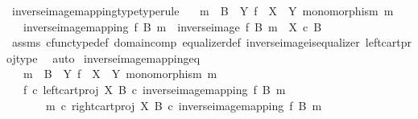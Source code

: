 \begin{isabellebody}
%
\endisatagproof
{\isafoldproof}%
%
\isadelimproof
\isanewline
%
\endisadelimproof
\isanewline
{}\isamarkupfalse%
\ inverse{\isacharunderscore}{\kern0pt}image{\isacharunderscore}{\kern0pt}mapping{\isacharunderscore}{\kern0pt}type{\isacharbrackleft}{\kern0pt}type{\isacharunderscore}{\kern0pt}rule{\isacharbrackright}{\kern0pt}{\isacharcolon}{\kern0pt}\isanewline
\ \ \ {\isachardoublequoteopen}m\ {\isacharcolon}{\kern0pt}\ B\ {\isasymrightarrow}\ Y{\isachardoublequoteclose}\ {\isachardoublequoteopen}f\ {\isacharcolon}{\kern0pt}\ X\ {\isasymrightarrow}\ Y{\isachardoublequoteclose}\ {\isachardoublequoteopen}monomorphism\ m{\isachardoublequoteclose}\isanewline
\ \ \ {\isachardoublequoteopen}inverse{\isacharunderscore}{\kern0pt}image{\isacharunderscore}{\kern0pt}mapping\ f\ B\ m\ {\isacharcolon}{\kern0pt}\ {\isacharparenleft}{\kern0pt}inverse{\isacharunderscore}{\kern0pt}image\ f\ B\ m{\isacharparenright}{\kern0pt}\ {\isasymrightarrow}\ X\ {\isasymtimes}\isactrlsub c\ B{\isachardoublequoteclose}\isanewline
%
\isadelimproof
\ \ %
\endisadelimproof
%
\isatagproof
{}\isamarkupfalse%
\ assms\ cfunc{\isacharunderscore}{\kern0pt}type{\isacharunderscore}{\kern0pt}def\ domain{\isacharunderscore}{\kern0pt}comp\ equalizer{\isacharunderscore}{\kern0pt}def\ inverse{\isacharunderscore}{\kern0pt}image{\isacharunderscore}{\kern0pt}is{\isacharunderscore}{\kern0pt}equalizer{}\ left{\isacharunderscore}{\kern0pt}cart{\isacharunderscore}{\kern0pt}proj{\isacharunderscore}{\kern0pt}type\ \isamarkupfalse%
\ auto%
\endisatagproof
{\isafoldproof}%
%
\isadelimproof
\isanewline
%
\endisadelimproof
\isanewline
{}\isamarkupfalse%
\ inverse{\isacharunderscore}{\kern0pt}image{\isacharunderscore}{\kern0pt}mapping{\isacharunderscore}{\kern0pt}eq{\isacharcolon}{\kern0pt}\isanewline
\ \ \ {\isachardoublequoteopen}m\ {\isacharcolon}{\kern0pt}\ B\ {\isasymrightarrow}\ Y{\isachardoublequoteclose}\ {\isachardoublequoteopen}f\ {\isacharcolon}{\kern0pt}\ X\ {\isasymrightarrow}\ Y{\isachardoublequoteclose}\ {\isachardoublequoteopen}monomorphism\ m{\isachardoublequoteclose}\isanewline
\ \ \ {\isachardoublequoteopen}f\ {\isasymcirc}\isactrlsub c\ left{\isacharunderscore}{\kern0pt}cart{\isacharunderscore}{\kern0pt}proj\ X\ B\ {\isasymcirc}\isactrlsub c\ inverse{\isacharunderscore}{\kern0pt}image{\isacharunderscore}{\kern0pt}mapping\ f\ B\ m\isanewline
\ \ \ \ \ \ {\isacharequal}{\kern0pt}\ m\ {\isasymcirc}\isactrlsub c\ right{\isacharunderscore}{\kern0pt}cart{\isacharunderscore}{\kern0pt}proj\ X\ B\ {\isasymcirc}\isactrlsub c\ inverse{\isacharunderscore}{\kern0pt}image{\isacharunderscore}{\kern0pt}mapping\ f\ B\ m{\isachardoublequoteclose}\isanewline

\end{isabellebody}

